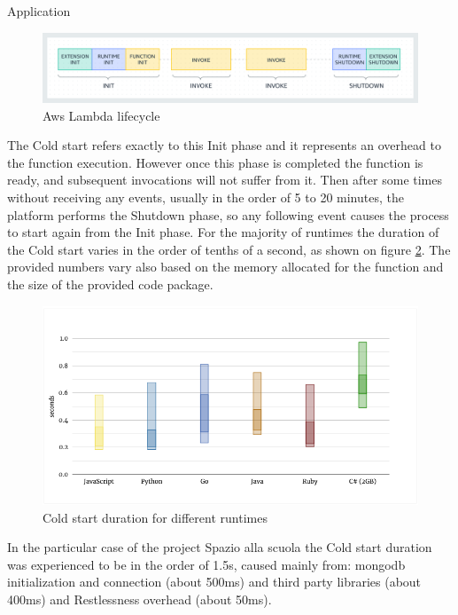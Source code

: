\begin{chapter}{Application}
    \begin{figure}
        \centering
        \includegraphics[width=\linewidth]{source/images/aws-lambda-lifecycle.png}
        \caption{Aws Lambda lifecycle}
        \label{fig:aws_lambda_lifecycle}
    \end{figure}

    The Cold start refers exactly to this Init phase and it represents an overhead to the
    function execution. However once this phase is completed the function is ready,
    and subsequent invocations will not suffer from it. Then after some times without
    receiving any events, usually in the order of 5 to 20 minutes, the platform performs
    the Shutdown phase, so any following event causes the process to start again from
    the Init phase.
    For the majority of runtimes the duration of the Cold start varies in the order
    of tenths of a second, as shown on figure \ref{fig:cold_start_duration}. The provided
    numbers vary also based on the memory allocated for the function and the size of the
    provided code package.

    \begin{figure}
        \centering
        \includegraphics[width=\linewidth]{source/images/cold-start-duration.png}
        \caption{Cold start duration for different runtimes}
        \label{fig:cold_start_duration}
    \end{figure}

    In the particular case of the project Spazio alla scuola the Cold start duration
    was experienced to be in the order of 1.5s, caused mainly from: mongodb
    initialization and connection (about 500ms) and third party libraries (about 400ms)
    and Restlessness overhead (about 50ms).


\end{chapter}
